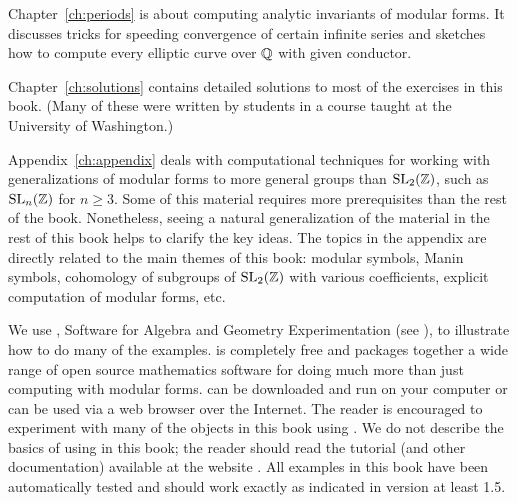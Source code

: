 Chapter~\ref{ch:periods} is about computing analytic invariants
of modular forms.  It discusses tricks for speeding convergence
of certain infinite series and sketches how to compute every
elliptic curve over $\mathbb{Q}$ with given conductor.

Chapter~\ref{ch:solutions} contains detailed solutions to most of the
exercises in this book.  (Many of these were written by students
in a course taught at the University of Washington.)

Appendix~\ref{ch:appendix} deals with computational techniques
for working with generalizations of modular forms to more general
groups than $\operatorname{SL}_2(\mathbb{Z})$, such as $\operatorname{SL}_n(\mathbb{Z})$ for $n\geq 3$.  Some of
this material requires more prerequisites than the rest of the book.
Nonetheless, seeing a natural generalization of the material in the
rest of this book helps to clarify the key ideas.  The
topics in the appendix are directly related to the main themes of
this book: modular symbols, Manin symbols, cohomology
of subgroups of $\operatorname{SL}_2(\mathbb{Z})$ with various coefficients, explicit
computation of modular forms, etc.

\medskip

\vspace{2ex}
We use \sage{}, Software for Algebra and Geometry Experimentation 
(see \cite{sage}), to illustrate how to do
many of the examples.  \sage{} is completely free and packages
together a wide range of open source mathematics software for doing
much more than just computing with modular forms.  \sage{} can be
downloaded and run on your computer or can be used via a web browser over
the Internet.  The reader is encouraged to experiment with many of the
objects in this book using \sage.  We do not describe the basics of
using \sage{} in this book; the reader should read the \sage{}
tutorial (and other documentation) available at the \sage{} website
\cite{sage}.   All examples in this book have been automatically
tested and should work exactly as indicated in \sage{} version
at least 1.5. 





